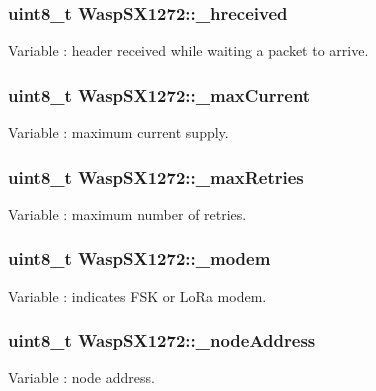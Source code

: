 \subsubsection[{\texorpdfstring{\+\_\+hreceived}{_hreceived}}]{\setlength{\rightskip}{0pt plus 5cm}uint8\+\_\+t Wasp\+S\+X1272\+::\+\_\+hreceived}\hypertarget{class_wasp_s_x1272_a05b54181f30cdbca8706a00b8ff0bec9}{}\label{class_wasp_s_x1272_a05b54181f30cdbca8706a00b8ff0bec9}
Variable \+: header received while waiting a packet to arrive. 
\subsubsection[{\texorpdfstring{\+\_\+max\+Current}{_maxCurrent}}]{\setlength{\rightskip}{0pt plus 5cm}uint8\+\_\+t Wasp\+S\+X1272\+::\+\_\+max\+Current}\hypertarget{class_wasp_s_x1272_a7a4e718645c2ff60ddea7bbcb530b6d2}{}\label{class_wasp_s_x1272_a7a4e718645c2ff60ddea7bbcb530b6d2}
Variable \+: maximum current supply. 
\subsubsection[{\texorpdfstring{\+\_\+max\+Retries}{_maxRetries}}]{\setlength{\rightskip}{0pt plus 5cm}uint8\+\_\+t Wasp\+S\+X1272\+::\+\_\+max\+Retries}\hypertarget{class_wasp_s_x1272_a96e8d83e71cde36dde2cbeeeb1db4f86}{}\label{class_wasp_s_x1272_a96e8d83e71cde36dde2cbeeeb1db4f86}
Variable \+: maximum number of retries. 
\subsubsection[{\texorpdfstring{\+\_\+modem}{_modem}}]{\setlength{\rightskip}{0pt plus 5cm}uint8\+\_\+t Wasp\+S\+X1272\+::\+\_\+modem}\hypertarget{class_wasp_s_x1272_ac90e11a42677f2fff97ab2caa3a4c676}{}\label{class_wasp_s_x1272_ac90e11a42677f2fff97ab2caa3a4c676}
Variable \+: indicates F\+SK or Lo\+Ra modem. 
\subsubsection[{\texorpdfstring{\+\_\+node\+Address}{_nodeAddress}}]{\setlength{\rightskip}{0pt plus 5cm}uint8\+\_\+t Wasp\+S\+X1272\+::\+\_\+node\+Address}\hypertarget{class_wasp_s_x1272_ad73e96b457d2671c53a305db57c0f15f}{}\label{class_wasp_s_x1272_ad73e96b457d2671c53a305db57c0f15f}
Variable \+: node address. 
